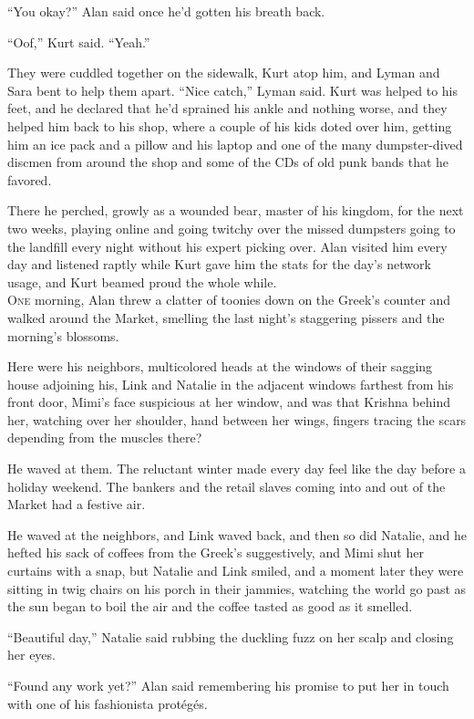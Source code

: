 ``You okay?'' Alan said once he'd gotten his breath back.

``Oof,'' Kurt said.  ``Yeah.''

They were cuddled together on the sidewalk, Kurt atop him, and Lyman
and Sara bent to help them apart.  ``Nice catch,'' Lyman said.  Kurt
was helped to his feet, and he declared that he'd sprained his ankle
and nothing worse, and they helped him back to his shop, where a
couple of his kids doted over him, getting him an ice pack and a
pillow and his laptop and one of the many dumpster-dived discmen from
around the shop and some of the CDs of old punk bands that he favored.

There he perched, growly as a wounded bear, master of his kingdom, for
the next two weeks, playing online and going twitchy over the missed
dumpsters going to the landfill every night without his expert picking
over.  Alan visited him every day and listened raptly while Kurt gave
him the stats for the day's network usage, and Kurt beamed proud the
whole while.
\\
\lettrine[lines=3, lhang=.5, nindent=0pt, findent=2pt]{O}{ne} morning, Alan threw a clatter of toonies down on the Greek's
counter and walked around the Market, smelling the last night's
staggering pissers and the morning's blossoms.

Here were his neighbors, multicolored heads at the windows of their
sagging house adjoining his, Link and Natalie in the adjacent windows
farthest from his front door, Mimi's face suspicious at her window,
and was that Krishna behind her, watching over her shoulder, hand
between her wings, fingers tracing the scars depending from the
muscles there?

He waved at them.  The reluctant winter made every day feel like the
day before a holiday weekend.  The bankers and the retail slaves
coming into and out of the Market had a festive air.

He waved at the neighbors, and Link waved back, and then so did
Natalie, and he hefted his sack of coffees from the Greek's
suggestively, and Mimi shut her curtains with a snap, but Natalie and
Link smiled, and a moment later they were sitting in twig chairs on
his porch in their jammies, watching the world go past as the sun
began to boil the air and the coffee tasted as good as it smelled.

``Beautiful day,'' Natalie said rubbing the duckling fuzz on her scalp
and closing her eyes.

``Found any work yet?'' Alan said remembering his promise to put her
in touch with one of his fashionista prot\'{e}g\'{e}s.

